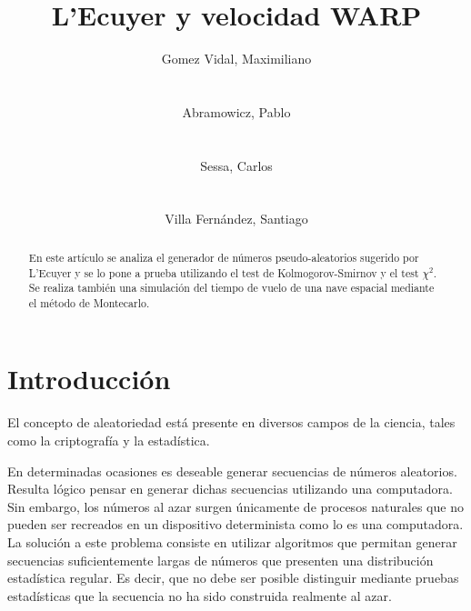 \documentclass{sig-alternate}
\begin{document}
\title{L'Ecuyer y velocidad WARP}


\author{
    \alignauthor
    Gomez Vidal, Maximiliano\\
     \\
    \ \\
    Abramowicz, Pablo\\
     \\
    \ \\
    \alignauthor
    Sessa, Carlos\\
     \\
    \ \\
    Villa Fern\'{a}ndez, Santiago\\
}

\maketitle

\begin{abstract}
En este art\'{i}culo se analiza el generador de n\'{u}meros pseudo-aleatorios
sugerido por L'Ecuyer y se lo pone a prueba utilizando el test de 
Kolmogorov-Smirnov y el test $\chi^{2}$. Se realiza tambi\'{e}n una simulaci\'{o}n
del tiempo de vuelo de una nave espacial mediante el m\'{e}todo de Montecarlo.
\end{abstract}


\section{Introducci\'{o}n}\label{introduccion}

El concepto de aleatoriedad est\'{a} presente en diversos campos de la ciencia,
tales como la criptograf\'{i}a y la estad\'{i}stica.

En determinadas ocasiones es deseable generar secuencias de n\'{u}meros
aleatorios. Resulta l\'{o}gico pensar en generar dichas secuencias utilizando
una computadora. Sin embargo, los n\'{u}meros al azar surgen \'{u}nicamente
de procesos naturales que no pueden ser recreados en un dispositivo determinista
como lo es una computadora. La soluci\'{o}n a este problema consiste en utilizar
algoritmos que permitan generar secuencias suficientemente largas de n\'{u}meros
que presenten una distribuci\'{o}n estad\'{i}stica regular. Es decir, que no debe
ser posible distinguir mediante pruebas estad\'{i}sticas que la secuencia no
ha sido construida realmente al azar.
\end{document}
